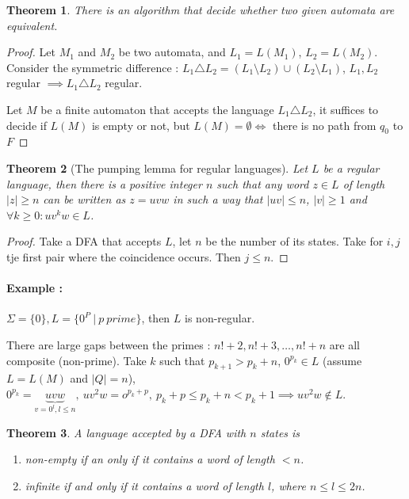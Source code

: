 \documentclass[a4paper,11pt]{article}
\newtheorem{thm}{Theorem}[section]
\begin{document}
\begin{thm}
  There is an algorithm that decide whether two given automata are equivalent.
\end{thm}

\begin{proof}
  Let $M_1$ and $M_2$ be two automata, and $L_1= L(M_1)$, $L_2 = L(M_2)$.
  Consider the symmetric difference : $L_1 \triangle L_2 = (L_1 \setminus L_2)
  \cup (L_2 \setminus L_1)$, $L_1,L_2$ regular $\implies L_1 \triangle L_2$
  regular.

  Let $M$ be a finite automaton that accepts the language $L_1 \triangle L_2$,
  it suffices to decide if $L(M)$ is empty or not, but $L(M) = \emptyset \iff $
  there is no path from $q_0$ to $F$
\end{proof}

\begin{thm}[The pumping lemma for regular languages]
  Let $L$ be a regular language, then there is a positive integer $n$ such that
  any word $z \in L$ of length $|z| \geq n$ can be written as $z = uvw$ in such
  a way that $|uv| \leq n$, $|v| \geq 1$ and $\forall k \geq 0 : uv^kw \in L$.
\end{thm}

\begin{proof}
  Take a DFA that accepts $L$, let $n$ be the number of its states. Take for
  $i,j$ tje first pair where the coincidence occurs. Then $j \leq n$.
\end{proof}

\paragraph{Example : } $\Sigma = \{0\}, L = \{0^P\ |\ p\ prime\}$,
then $L$ is non-regular.

There are large gaps between the primes : $n!+ 2, n! + 3, \dots, n! + n$ are all
composite (non-prime). Take $k$ such that $p_{k+1} > p_k + n$, $0^{p_k} \in L $
(assume $L = L(M)$ and $|Q|=n$), $0^{p_k} = \underbrace{uvw}_{v=0^l,l \leq n},\
uv^2w = o^{p_k + p},\ p_k + p \leq p_k + n < p_k + 1 \implies uv^2w \not \in L$.

\begin{thm}
  A language accepted by a DFA with $n$ states is
  \begin{enumerate}
  \item non-empty if an only if it contains a word of length $< n$.
  \item infinite if and only if it contains a word of length $l$, where $n \leq
    l \leq 2n$.
  \end{enumerate}
\end{thm}
\end{document}
